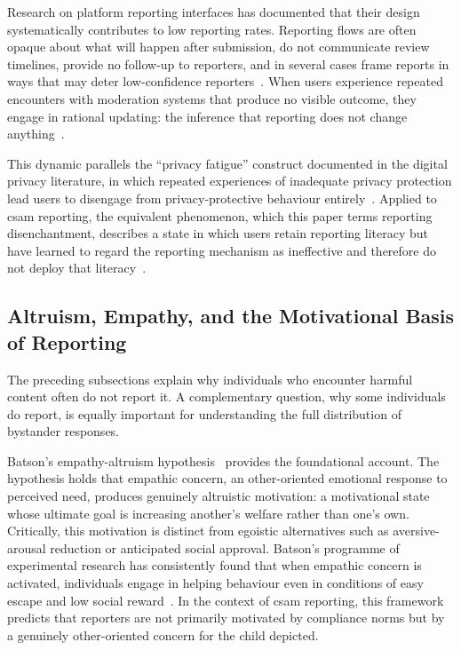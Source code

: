 \documentclass{ieee-portfolio}
\begin{document}
Research on platform reporting interfaces has documented that their design systematically contributes to low reporting rates. Reporting flows are often opaque about what will happen after submission, do not communicate review timelines, provide no follow-up to reporters, and in several cases frame reports in ways that may deter low-confidence reporters~\cite{wong_combating_2016,huang_severity_2023}. When users experience repeated encounters with moderation systems that produce no visible outcome, they engage in rational updating: the inference that reporting does not change anything~\cite{jeyagobi_factors_2022}.
 
This dynamic parallels the ``privacy fatigue'' construct documented in the digital privacy literature, in which repeated experiences of inadequate privacy protection lead users to disengage from privacy-protective behaviour entirely~\cite{tian_privacy_2022}. Applied to \gls{csam} reporting, the equivalent phenomenon, which this paper terms reporting disenchantment, describes a state in which users retain reporting literacy but have learned to regard the reporting mechanism as ineffective and therefore do not deploy that literacy~\cite{wong_combating_2016}.

\subsection{Altruism, Empathy, and the Motivational Basis of Reporting}

The preceding subsections explain why individuals who encounter harmful content often do not report it. A complementary question, why some individuals do report, is equally important for understanding the full distribution of bystander responses.

Batson's empathy-altruism hypothesis~\cite{batson_altruism_2011} provides the foundational account. The hypothesis holds that empathic concern, an other-oriented emotional response to perceived need, produces genuinely altruistic motivation: a motivational state whose ultimate goal is increasing another's welfare rather than one's own. Critically, this motivation is distinct from egoistic alternatives such as aversive-arousal reduction or anticipated social approval. Batson's programme of experimental research has consistently found that when empathic concern is activated, individuals engage in helping behaviour even in conditions of easy escape and low social reward~\cite{batson_altruism_2011}. In the context of \gls{csam} reporting, this framework predicts that reporters are not primarily motivated by compliance norms but by a genuinely other-oriented concern for the child depicted.
\end{document}
